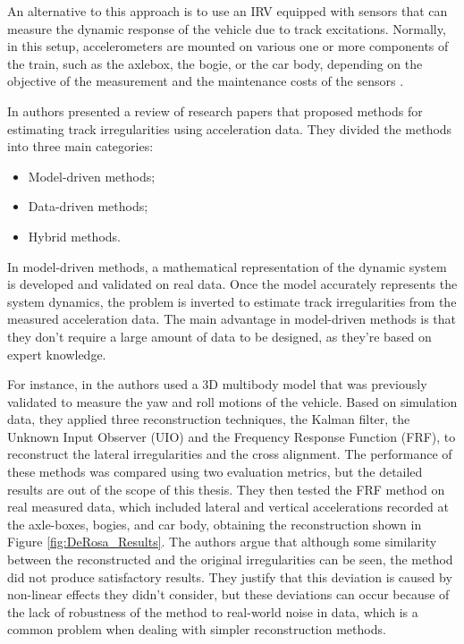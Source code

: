 An alternative to this approach is to use an IRV equipped with sensors that can measure the dynamic response of the vehicle due to track excitations. Normally, in this setup, accelerometers are mounted on various one or more components of the train, such as the axlebox, the bogie, or the car body, depending on the objective of the measurement and the maintenance costs of the sensors \cite{vibration7040049,Sansinena26032025}. 

In \cite{Sansinena26032025} authors presented a review of research papers that proposed methods for estimating track irregularities using acceleration data. They divided the methods into three main categories:
\begin{itemize}
    \item Model-driven methods;
    \item Data-driven methods;
    \item Hybrid methods.
\end{itemize}

In model-driven methods, a mathematical representation of the dynamic system is developed and validated on real data. Once the model accurately represents the system dynamics, the problem is inverted to estimate track irregularities from the measured acceleration data. The main advantage in model-driven methods is that they don't require a large amount of data to be designed, as they're based on expert knowledge. 

For instance, in \cite{DEROSA2019606} the authors used a 3D multibody model that was previously validated to measure the yaw and roll motions of the vehicle. Based on simulation data, they applied three reconstruction techniques, the Kalman filter, the Unknown Input Observer (UIO) and the Frequency Response Function (FRF), to reconstruct the lateral irregularities and the cross alignment. The performance of these methods was compared using two evaluation metrics, but the detailed results are out of the scope of this thesis. They then tested the FRF method on real measured data, which included lateral and vertical accelerations recorded at the axle-boxes, bogies, and car body, obtaining the reconstruction shown in Figure \ref{fig:DeRosa_Results}. The authors argue that although some similarity between the reconstructed and the original irregularities can be seen, the method did not produce satisfactory results. They justify that this deviation is caused by non-linear effects they didn't consider, but these deviations can occur because of the lack of robustness of the method to real-world noise in data, which is a common problem when dealing with simpler reconstruction methods.

